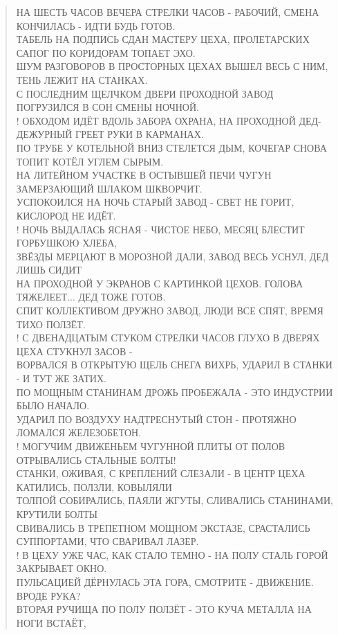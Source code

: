 \poemtitle{***}
\begin{verse}
НА ШЕСТЬ ЧАСОВ ВЕЧЕРА СТРЕЛКИ ЧАСОВ - РАБОЧИЙ, СМЕНА КОНЧИЛАСЬ - ИДТИ БУДЬ ГОТОВ.\\
ТАБЕЛЬ НА ПОДПИСЬ СДАН МАСТЕРУ ЦЕХА, ПРОЛЕТАРСКИХ САПОГ ПО КОРИДОРАМ ТОПАЕТ ЭХО.\\
ШУМ РАЗГОВОРОВ В ПРОСТОРНЫХ ЦЕХАХ ВЫШЕЛ ВЕСЬ С НИМ, ТЕНЬ ЛЕЖИТ НА СТАНКАХ.\\
С ПОСЛЕДНИМ ЩЕЛЧКОМ ДВЕРИ ПРОХОДНОЙ ЗАВОД ПОГРУЗИЛСЯ В СОН СМЕНЫ НОЧНОЙ.\\!
ОБХОДОМ ИДЁТ ВДОЛЬ ЗАБОРА ОХРАНА, НА ПРОХОДНОЙ ДЕД-ДЕЖУРНЫЙ ГРЕЕТ РУКИ В КАРМАНАХ.\\
ПО ТРУБЕ У КОТЕЛЬНОЙ ВНИЗ СТЕЛЕТСЯ ДЫМ, КОЧЕГАР СНОВА ТОПИТ КОТЁЛ УГЛЕМ СЫРЫМ.\\
НА ЛИТЕЙНОМ УЧАСТКЕ В ОСТЫВШЕЙ ПЕЧИ ЧУГУН ЗАМЕРЗАЮЩИЙ ШЛАКОМ ШКВОРЧИТ.\\
УСПОКОИЛСЯ НА НОЧЬ СТАРЫЙ ЗАВОД - СВЕТ НЕ ГОРИТ, КИСЛОРОД НЕ ИДЁТ.\\!
НОЧЬ ВЫДАЛАСЬ ЯСНАЯ - ЧИСТОЕ НЕБО, МЕСЯЦ БЛЕСТИТ ГОРБУШКОЮ ХЛЕБА,\\
ЗВЁЗДЫ МЕРЦАЮТ В МОРОЗНОЙ ДАЛИ, ЗАВОД ВЕСЬ УСНУЛ, ДЕД ЛИШЬ СИДИТ\\
НА ПРОХОДНОЙ У ЭКРАНОВ С КАРТИНКОЙ ЦЕХОВ. ГОЛОВА ТЯЖЕЛЕЕТ... ДЕД ТОЖЕ ГОТОВ.\\
СПИТ КОЛЛЕКТИВОМ ДРУЖНО ЗАВОД, ЛЮДИ ВСЕ СПЯТ, ВРЕМЯ ТИХО ПОЛЗЁТ.\\!
С ДВЕНАДЦАТЫМ СТУКОМ СТРЕЛКИ ЧАСОВ ГЛУХО В ДВЕРЯХ ЦЕХА СТУКНУЛ ЗАСОВ - \\
ВОРВАЛСЯ В ОТКРЫТУЮ ЩЕЛЬ СНЕГА ВИХРЬ, УДАРИЛ В СТАНКИ - И ТУТ ЖЕ ЗАТИХ.\\
ПО МОЩНЫМ СТАНИНАМ ДРОЖЬ ПРОБЕЖАЛА - ЭТО ИНДУСТРИИ БЫЛО НАЧАЛО.\\
УДАРИЛ ПО ВОЗДУХУ НАДТРЕСНУТЫЙ СТОН - ПРОТЯЖНО ЛОМАЛСЯ ЖЕЛЕЗОБЕТОН.\\!
МОГУЧИМ ДВИЖЕНЬЕМ ЧУГУННОЙ ПЛИТЫ ОТ ПОЛОВ ОТРЫВАЛИСЬ СТАЛЬНЫЕ БОЛТЫ!\\
СТАНКИ, ОЖИВАЯ, С КРЕПЛЕНИЙ СЛЕЗАЛИ - В ЦЕНТР ЦЕХА КАТИЛИСЬ, ПОЛЗЛИ, КОВЫЛЯЛИ\\
ТОЛПОЙ СОБИРАЛИСЬ, ПАЯЛИ ЖГУТЫ, СЛИВАЛИСЬ СТАНИНАМИ, КРУТИЛИ БОЛТЫ\\
СВИВАЛИСЬ В ТРЕПЕТНОМ МОЩНОМ ЭКСТАЗЕ, СРАСТАЛИСЬ СУППОРТАМИ, ЧТО СВАРИВАЛ ЛАЗЕР.\\!
В ЦЕХУ УЖЕ ЧАС, КАК СТАЛО ТЕМНО - НА ПОЛУ СТАЛЬ ГОРОЙ ЗАКРЫВАЕТ ОКНО.\\
ПУЛЬСАЦИЕЙ ДЁРНУЛАСЬ ЭТА ГОРА, СМОТРИТЕ - ДВИЖЕНИЕ. ВРОДЕ РУКА?\\
ВТОРАЯ РУЧИЩА ПО ПОЛУ ПОЛЗЁТ - ЭТО КУЧА МЕТАЛЛА НА НОГИ ВСТАЁТ,\\

\end{verse}

